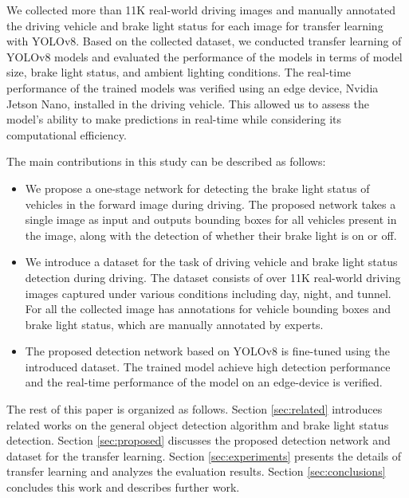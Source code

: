 We collected more than 11K real-world driving images and manually annotated the driving vehicle and brake light status for each image for transfer learning with YOLOv8. 
Based on the collected dataset, we conducted transfer learning of YOLOv8 models and evaluated the performance of the models in terms of model size, brake light status, and ambient lighting conditions.
The real-time performance of the trained models was verified using an edge device, Nvidia Jetson Nano, installed in the driving vehicle.
This allowed us to assess the model's ability to make predictions in real-time while considering its computational efficiency.

The main contributions in this study can be described as follows:
\begin{itemize}
    \item We propose a one-stage network for detecting the brake light status of vehicles in the forward image during driving. The proposed network takes a single image as input and outputs bounding boxes for all vehicles present in the image, along with the detection of whether their brake light is on or off. 
    \item We introduce a dataset for the task of driving vehicle and brake light status detection during driving. The dataset consists of over 11K real-world driving images captured under various conditions including day, night, and tunnel. For all the collected image has annotations for vehicle bounding boxes and brake light status, which are manually annotated by experts.
    \item The proposed detection network based on YOLOv8 is fine-tuned using the introduced dataset. The trained model achieve high detection performance and the real-time performance of the model on an edge-device is verified.
\end{itemize}

The rest of this paper is organized as follows. 
Section \ref{sec:related} introduces related works on the general object detection algorithm and brake light status detection. 
Section \ref{sec:proposed} discusses the proposed detection network and dataset for the transfer learning.
Section \ref{sec:experiments} presents the details of transfer learning and analyzes the evaluation results.
Section \ref{sec:conclusions} concludes this work and describes further work. 